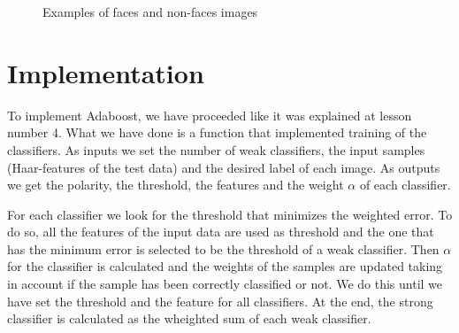 \documentclass{article}
\begin{document}
\begin{figure}[htbp]
\centering
{}
\caption{Examples of faces and non-faces images} \label{fig:facesExample}
\end{figure}

\section{Implementation}
To implement Adaboost, we have proceeded like it was explained at lesson number 4. What we have done is a function that implemented training of the classifiers. As inputs we set the number of weak classifiers, the input samples (Haar-features of the test data) and the desired label of each image. As outputs we get the polarity, the threshold, the features and the weight $\alpha$ of each classifier. 

For each classifier we look for the threshold that minimizes the weighted error. To do so, all the features of the input data are used as threshold and the one that has the minimum error is selected to be the threshold of a weak classifier. Then $\alpha$ for the classifier is calculated and the weights of the samples are updated taking in account if the sample has been correctly classified or not. We do this until we have set the threshold and the feature for all classifiers. At the end, the strong classifier is calculated as the wheighted sum of each weak classifier. 
\end{document}

